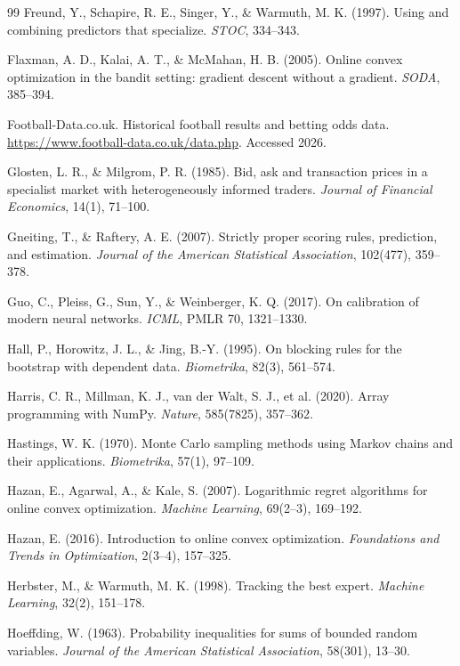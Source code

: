 \documentclass[12pt,a4paper,oneside]{report}
\renewcommand{\_}{\oldunderscore\allowbreak}
\theoremstyle{definition}
\theoremstyle{plain}
\theoremstyle{definition}   %
\begin{document}
\begin{thebibliography}{99}
 Freund, Y., Schapire, R. E., Singer, Y., \& Warmuth, M. K. (1997).
Using and combining predictors that specialize. \emph{STOC}, 334--343.

 Flaxman, A. D., Kalai, A. T., \& McMahan, H. B. (2005). Online convex
optimization in the bandit setting: gradient descent without a gradient. \emph{SODA},
385--394.

 Football-Data.co.uk. Historical football results and betting odds data.
\url{https://www.football-data.co.uk/data.php}. Accessed 2026.

 Glosten, L. R., \& Milgrom, P. R. (1985). Bid, ask and transaction
prices in a specialist market with heterogeneously informed traders.
\emph{Journal of Financial Economics}, 14(1), 71--100.

 Gneiting, T., \& Raftery, A. E. (2007). Strictly proper scoring rules,
prediction, and estimation. \emph{Journal of the American Statistical Association}, 102(477),
359--378.

 Guo, C., Pleiss, G., Sun, Y., \& Weinberger, K. Q. (2017). On calibration
of modern neural networks. \emph{ICML}, PMLR 70, 1321--1330.

 Hall, P., Horowitz, J. L., \& Jing, B.-Y. (1995). On blocking rules for
the bootstrap with dependent data. \emph{Biometrika}, 82(3), 561--574.

 Harris, C. R., Millman, K. J., van der Walt, S. J., et al. (2020). Array
programming with NumPy. \emph{Nature}, 585(7825), 357--362.

 Hastings, W. K. (1970). Monte Carlo sampling methods using Markov
chains and their applications. \emph{Biometrika}, 57(1), 97--109.

 Hazan, E., Agarwal, A., \& Kale, S. (2007). Logarithmic regret
algorithms for online convex optimization. \emph{Machine Learning}, 69(2--3), 169--192.

 Hazan, E. (2016). Introduction to online convex optimization.
\emph{Foundations and Trends in Optimization}, 2(3--4), 157--325.

 Herbster, M., \& Warmuth, M. K. (1998). Tracking the best expert.
\emph{Machine Learning}, 32(2), 151--178.

 Hoeffding, W. (1963). Probability inequalities for sums of bounded
random variables. \emph{Journal of the American Statistical Association}, 58(301), 13--30.


\end{thebibliography}
\end{document}
